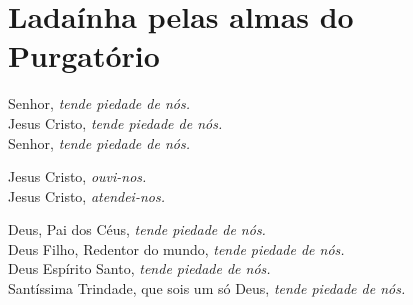 \section*{Ladaínha pelas almas do Purgatório}
Senhor, \textit{tende piedade de nós.} \\
Jesus Cristo, \textit{tende piedade de nós.} \\
Senhor, \textit{tende piedade de nós.}

Jesus Cristo, \textit{ouvi-nos.} \\
Jesus Cristo, \textit{atendei-nos.}

Deus, Pai dos Céus, \textit{tende piedade de nós.} \\
Deus Filho, Redentor do mundo, \textit{tende piedade de nós.} \\
Deus Espírito Santo, \textit{tende piedade de nós.} \\

Santíssima Trindade, que sois um só Deus, \textit{tende piedade de nós.} \\


